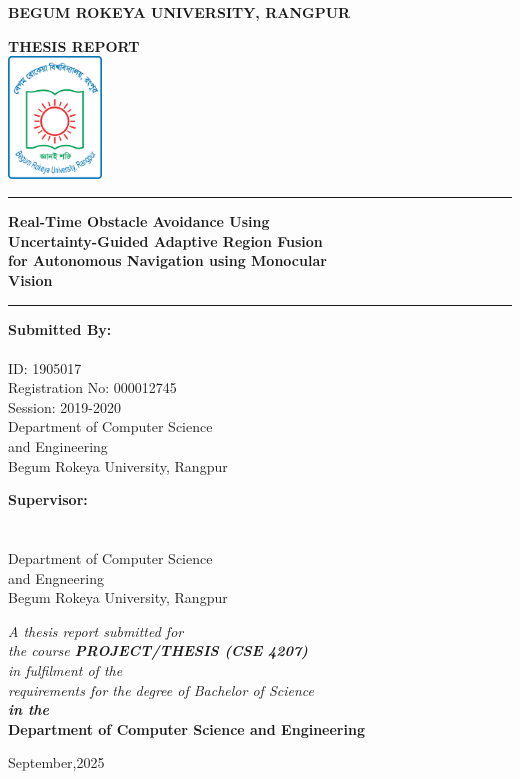 \begin{titlepage}
\begin{center}
{\Large \textbf{BEGUM ROKEYA UNIVERSITY, RANGPUR}}

\vspace{1cm}
{ \textbf{THESIS REPORT}}\\
\vspace{1cm}
\includegraphics[width=2.5cm]{BRUR_Logo.svg.png}\\

\vspace{1cm}
\rule{\textwidth}{0.4pt}

\vspace{0.3cm}
{\Large \textbf{Real-Time Obstacle Avoidance Using\\
Uncertainty-Guided Adaptive Region Fusion\\
for Autonomous Navigation using Monocular\\
Vision} }
\vspace{0.3cm}

\rule{\textwidth}{0.4pt}

\vspace{1.5cm}
\begin{minipage}[t]{0.45\textwidth}
\textbf{Submitted By:}\\
\theauthor\\
ID: 1905017\\
Registration No: 000012745\\
Session: 2019-2020\\
Department of Computer Science \\and Engineering\\
Begum Rokeya University, Rangpur
\end{minipage}
\hfill
\begin{minipage}[t]{0.45\textwidth}
\textbf{Supervisor:}\\
\thesupervisor\\
\thesupervisortitle\\
Department of Computer Science\\ and Engneering\\
Begum Rokeya University, Rangpur
\end{minipage}

\vspace{1.5cm}
\textit{A thesis report submitted for\\
the course \textbf{PROJECT/THESIS (CSE 4207)}\\
in fulfilment of the\\
requirements for the degree of Bachelor of Science\\
\textbf{in the}}\\
\large \textbf{Department of Computer Science and Engineering}

\vspace{0.5cm}
\small September,2025
\end{center}
\end{titlepage}
